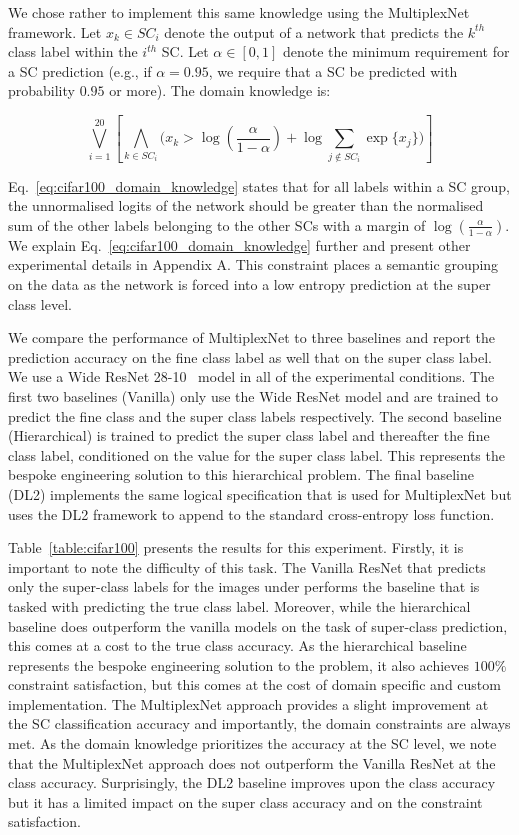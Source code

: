 \documentclass[letterpaper]{article} %
\begin{document}
We chose rather to implement this same knowledge using the MultiplexNet framework.
Let $x_{k} \in SC_i$ denote the output of a network that predicts the $k^{th}$ class label within the $i^{th}$ SC.
Let $\alpha \in [0, 1]$ denote the minimum requirement for a SC prediction (e.g., if  $\alpha = 0.95$, we require that a SC be predicted with probability $0.95$ or more).
The domain knowledge is:

\begin{equation}
    \label{eq:cifar100_domain_knowledge}
    \bigvee_{i=1}^{20} \left[ \bigwedge_{k \in SC_i} \Big( x_{k} > \log(\frac{\alpha}{1-\alpha}) + \log \sum\limits_{j \notin SC_i} \exp \{ x_j \} \Big) \right]
\end{equation}

Eq.~\ref{eq:cifar100_domain_knowledge} states that for all labels within a SC group, the unnormalised logits of the network should be greater than the normalised sum of the other labels belonging to the other SCs with a margin of $\log(\frac{\alpha}{1-\alpha})$.
We explain Eq.~\ref{eq:cifar100_domain_knowledge} further and present other experimental details in Appendix A.
This constraint places a semantic grouping on the data as the network is forced into a low entropy prediction at the super class level.

We compare the performance of MultiplexNet to three baselines and report the prediction accuracy on the fine class label as well that on the super class label. 
We use a Wide ResNet 28-10~\citep{zagoruyko2016wide} model in all of the experimental conditions. 
The first two baselines (Vanilla) only use the Wide ResNet model and are trained to predict the fine class and the super class labels respectively.
The second baseline (Hierarchical) is trained to predict the super class label and thereafter the fine class label, conditioned on the value for the super class label. 
This represents the bespoke engineering solution to this hierarchical problem.
The final baseline (DL2) implements the same logical specification that is used for MultiplexNet but uses the DL2 framework to append to the standard cross-entropy loss function.

Table~\ref{table:cifar100} presents the results for this experiment.
Firstly, it is important to note the difficulty of this task. 
The Vanilla ResNet that predicts only the super-class labels for the images under performs the baseline that is tasked with predicting the true class label.
Moreover, while the hierarchical baseline does outperform the vanilla models on the task of super-class prediction, this comes at a cost to the true class accuracy.
As the hierarchical baseline represents the bespoke engineering solution to the problem, it also achieves $100\%$ constraint satisfaction, but this comes at the cost of domain specific and custom implementation.
The MultiplexNet approach provides a slight improvement at the SC classification accuracy and importantly, the domain constraints are always met.
As the domain knowledge prioritizes the accuracy at the SC level, we note that the MultiplexNet approach does not outperform the Vanilla ResNet at the class accuracy.
Surprisingly, the DL2 baseline improves upon the class accuracy but it has a limited impact on the super class accuracy and on the constraint satisfaction.
\end{document}
